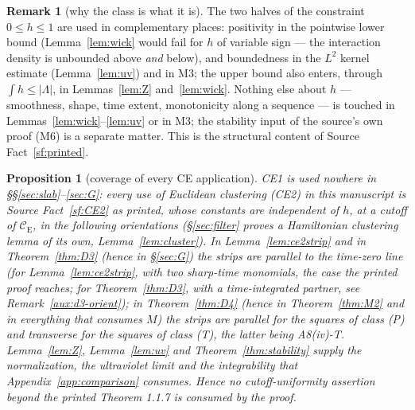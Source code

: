 \documentclass[11pt,a4paper]{article}
\theoremstyle{plain}
\newtheorem{proposition}[theorem]{Proposition}
\theoremstyle{definition}
\newtheorem{remark}[theorem]{Remark}
\theoremstyle{plain}
\theoremstyle{definition}
\newcommand{\CE}{\mathcal{C}_{\mathrm E}}
\begin{document}
\begin{remark}[why the class is what it is]\label{rem:whyclass}
The two halves of the constraint $0\le h\le1$ are used in complementary places:
positivity in the pointwise lower bound (Lemma~\ref{lem:wick} would fail for $h$ of
variable sign --- the interaction density is unbounded above \emph{and} below), and
boundedness in the $L^2$ kernel estimate (Lemma~\ref{lem:uv}) and in M3; the upper bound
also enters, through $\int h\le|\Lambda|$, in Lemmas~\ref{lem:Z} and~\ref{lem:wick}.
Nothing else about
$h$ --- smoothness, shape, time extent, monotonicity along a sequence --- is touched in
Lemmas~\ref{lem:wick}--\ref{lem:uv} or in M3; the stability input of the source's own proof
(M6) is a separate matter. This is the structural content of Source Fact~\ref{sf:printed}.
\end{remark}

\begin{proposition}[coverage of every CE application]\label{prop:discharge}
CE1 is used nowhere in \S\S\ref{sec:slab}--\ref{sec:G}: every use of Euclidean clustering
(CE2) in this manuscript is Source Fact~\ref{sf:CE2} as printed, whose constants are
independent of $h$, at a cutoff of $\CE$, in the following orientations (\S\ref{sec:filter}
proves a Hamiltonian clustering lemma of its own, Lemma~\ref{lem:cluster}).  In
Lemma~\ref{lem:ce2strip} and in Theorem~\ref{thm:D3} (hence in \S\ref{sec:G}) the strips are
parallel to the time-zero line (for Lemma~\ref{lem:ce2strip}, with two sharp-time monomials, the
case the printed proof reaches; for Theorem~\ref{thm:D3}, with a time-integrated partner, see
Remark~\ref{aux:d3-orient}); in Theorem~\ref{thm:D4} (hence in
Theorem~\ref{thm:M2} and in everything that consumes $M$) the strips are parallel for the
squares of class (P) and transverse for the squares of class (T), the latter being
A8(iv)-T.  Lemma~\ref{lem:Z}, Lemma~\ref{lem:uv} and Theorem~\ref{thm:stability} supply
the normalization, the ultraviolet limit and the integrability that
Appendix~\ref{app:comparison} consumes.  Hence no cutoff-uniformity assertion beyond the
printed Theorem 1.1.7 is consumed by the proof.
\end{proposition}
\end{document}
